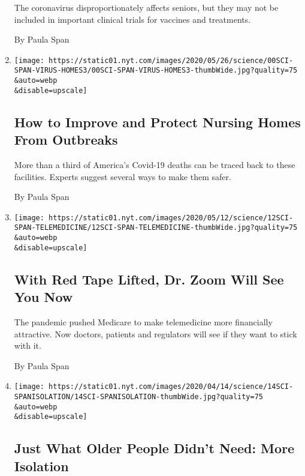 \begin{enumerate}
  The coronavirus disproportionately affects seniors, but they may not
  be included in important clinical trials for vaccines and treatments.

  By Paula Span
\item
  \href{/2020/05/22/health/coronavirus-nursing-homes.html}{}

  \texttt{[image: https://static01.nyt.com/images/2020/05/26/science/00SCI-SPAN-VIRUS-HOMES3/00SCI-SPAN-VIRUS-HOMES3-thumbWide.jpg?quality=75\\\&auto=webp\\\&disable=upscale]}

  \hypertarget{how-to-improve-and-protect-nursing-homes-from-outbreaks}{%
  \subsection{How to Improve and Protect Nursing Homes From
  Outbreaks}\label{how-to-improve-and-protect-nursing-homes-from-outbreaks}}

  More than a third of America's Covid-19 deaths can be traced back to
  these facilities. Experts suggest several ways to make them safer.

  By Paula Span
\item
  \href{/2020/05/08/health/coronavirus-telemedicine-seniors.html}{}

  \texttt{[image: https://static01.nyt.com/images/2020/05/12/science/12SCI-SPAN-TELEMEDICINE/12SCI-SPAN-TELEMEDICINE-thumbWide.jpg?quality=75\\\&auto=webp\\\&disable=upscale]}

  \hypertarget{with-red-tape-lifted-dr-zoom-will-see-you-now}{%
  \subsection{With Red Tape Lifted, Dr. Zoom Will See You
  Now}\label{with-red-tape-lifted-dr-zoom-will-see-you-now}}

  The pandemic pushed Medicare to make telemedicine more financially
  attractive. Now doctors, patients and regulators will see if they want
  to stick with it.

  By Paula Span
\item
  \href{/2020/04/13/health/coronavirus-elderly-isolation-loneliness.html}{}

  \texttt{[image: https://static01.nyt.com/images/2020/04/14/science/14SCI-SPANISOLATION/14SCI-SPANISOLATION-thumbWide.jpg?quality=75\\\&auto=webp\\\&disable=upscale]}

  \hypertarget{just-what-older-people-didnt-need-more-isolation}{%
  \subsection{Just What Older People Didn't Need: More
  Isolation}\label{just-what-older-people-didnt-need-more-isolation}}


\end{enumerate}
